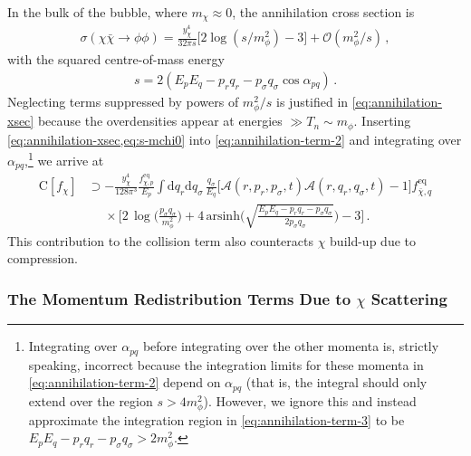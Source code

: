 \documentclass[
onecolumn, %
11pt, %
tightenlines,
superscriptaddress, %
nofootinbib, %
preprintnumbers, %
prd %
]{revtex4-1}
\newcommand{\upd}{\mathrm d}                                          %
\newcommand{\ba}[1]{\bigg(#1\bigg)}                                   %
\newcommand{\bb}[1]{\bigg[#1\bigg]}                                   %
\newcommand{\A}{\ensuremath{\mathcal A}\xspace}
\begin{document}
In the bulk of the bubble, where $m_\chi \approx 0$, the annihilation cross section is
%
\begin{align}
    \sigma(\chi\bar\chi \to \phi\phi) =
        \frac{y_\chi^4}{32 \pi s} \big[ 2\log(s/m_\phi^2) - 3 \big]
      + \mathcal O(m_\phi^2/s) \,,
    \label{eq:annihilation-xsec}
\end{align}
%
with the squared centre-of-mass energy
%
\begin{align}
    s = 2 (E_p E_q - p_r q_r - p_\sigma q_\sigma \cos\alpha_{pq}) \,.
    \label{eq:s-mchi0}
\end{align}
%
Neglecting terms suppressed by powers of $m_\phi^2/s$ is justified in \cref{eq:annihilation-xsec} because the overdensities appear at energies $\gg T_n \sim m_\phi$.  Inserting \cref{eq:annihilation-xsec,eq:s-mchi0} into \cref{eq:annihilation-term-2} and integrating over $\alpha_{pq}$,\footnote{Integrating over $\alpha_{pq}$ before integrating over the other momenta is, strictly speaking, incorrect because the integration limits for these momenta in \cref{eq:annihilation-term-2} depend on $\alpha_{pq}$ (that is, the integral should only extend over the region $s>4m_\phi^2$). However, we ignore this and instead approximate the integration region in \cref{eq:annihilation-term-3} to be $E_p E_q - p_r q_r - p_\sigma q_\sigma > 2 m_\phi^2$.} we arrive at
%
\begin{align}
    \boldsymbol{\mathrm C}[f_\chi] &\supset
      - \frac{y_\chi^4}{128\pi^3}  \frac{f_{\chi,p}^\text{eq}}{E_{p}}
        \int \! \upd q_r \upd q_\sigma \, \frac{q_\sigma}{E_q}
        \big[ \A(r,p_r,p_\sigma,t) \A(r,q_r,q_\sigma,t) - 1 \big] f_{\bar\chi,q}^\text{eq} \nonumber\\
    &\phantom{\supset} \times
      \bb{ 2\,{\log} \ba{\frac{p_\sigma q_\sigma}{m_\phi^2}}
         + 4\,{\text{arsinh}}\ba{ \sqrt{\frac{E_p E_q-p_rq_r-p_\sigma q_\sigma}{2 p_\sigma q_\sigma}} } - 3} \,.
    \label{eq:annihilation-term-3}
\end{align}
%
This contribution to the collision term also counteracts $\chi$ build-up due to compression.


\subsubsection{The Momentum Redistribution Terms Due to $\chi$ Scattering}
\end{document}

